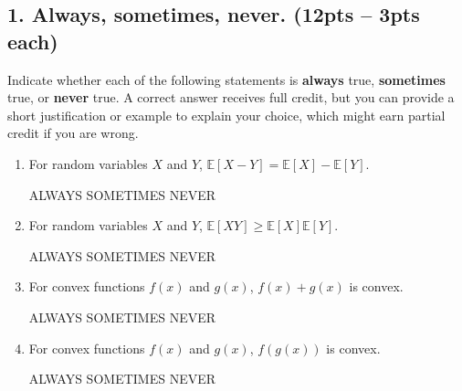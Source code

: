 \documentclass[10pt]{article}
\newcommand{\E}{\mathbb{E}}
\begin{document}
\subsection{1. Always, sometimes, never. (\textbf{\small 12pts -- 3pts each})} 
Indicate whether each of the following statements is \textbf{always} true, \textbf{sometimes} true, or \textbf{never} true. A correct answer receives full credit, but you can provide a short justification or example to explain your choice, which might earn partial credit if you are wrong. 
\begin{enumerate}[label=(\alph*)]
	\item For random variables $X$ and $Y$, $\E[X - Y]  =  \E[X] - \E[Y]$. 
	
	ALWAYS\hspace{1em} SOMETIMES\hspace{1em} NEVER\vspace{4em}
	
	\item For random variables $X$ and $Y$, $\E[X Y]  \geq  \E[X]\E[Y]$. 
	
	ALWAYS\hspace{1em} SOMETIMES\hspace{1em} NEVER\vspace{4em}
	
	\item For convex functions $f(x)$ and $g(x)$, $f(x) + g(x)$ is convex.
	
	ALWAYS\hspace{1em} SOMETIMES\hspace{1em} NEVER\vspace{4em}
	
	
	\item For convex functions $f(x)$ and $g(x)$, $f(g(x))$ is convex.
	
	ALWAYS\hspace{1em} SOMETIMES\hspace{1em} NEVER\vspace{4em}
	
\end{enumerate}
\end{document}

